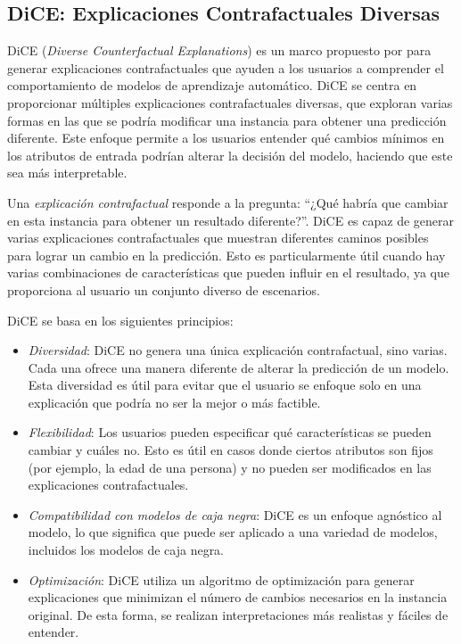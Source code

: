 \subsection{DiCE: Explicaciones Contrafactuales Diversas}

DiCE (\textit{Diverse Counterfactual Explanations}) es un marco propuesto por \textcite{mothilal2020dice} para generar explicaciones contrafactuales que ayuden a los usuarios a comprender el comportamiento de modelos de aprendizaje automático. DiCE se centra en proporcionar múltiples explicaciones contrafactuales diversas, que exploran varias formas en las que se podría modificar una instancia para obtener una predicción diferente. Este enfoque permite a los usuarios entender qué cambios mínimos en los atributos de entrada podrían alterar la decisión del modelo, haciendo que este sea más interpretable.

Una \textit{explicación contrafactual} responde a la pregunta: “¿Qué habría que cambiar en esta instancia para obtener un resultado diferente?”. DiCE es capaz de generar varias explicaciones contrafactuales que muestran diferentes caminos posibles para lograr un cambio en la predicción. Esto es particularmente útil cuando hay varias combinaciones de características que pueden influir en el resultado, ya que proporciona al usuario un conjunto diverso de escenarios.

DiCE se basa en los siguientes principios:

\begin{itemize}
    \item \textit{Diversidad}: DiCE no genera una única explicación contrafactual, sino varias. Cada una ofrece una manera diferente de alterar la predicción de un modelo. Esta diversidad es útil para evitar que el usuario se enfoque solo en una explicación que podría no ser la mejor o más factible.
    \item \textit{Flexibilidad}: Los usuarios pueden especificar qué características se pueden cambiar y cuáles no. Esto es útil en casos donde ciertos atributos son fijos (por ejemplo, la edad de una persona) y no pueden ser modificados en las explicaciones contrafactuales.
    \item \textit{Compatibilidad con modelos de caja negra}: DiCE es un enfoque agnóstico al modelo, lo que significa que puede ser aplicado a una variedad de modelos, incluidos los modelos de caja negra.
    \item \textit{Optimización}: DiCE utiliza un algoritmo de optimización para generar explicaciones que minimizan el número de cambios necesarios en la instancia original. De esta forma, se realizan interpretaciones más realistas y fáciles de entender.
\end{itemize}

